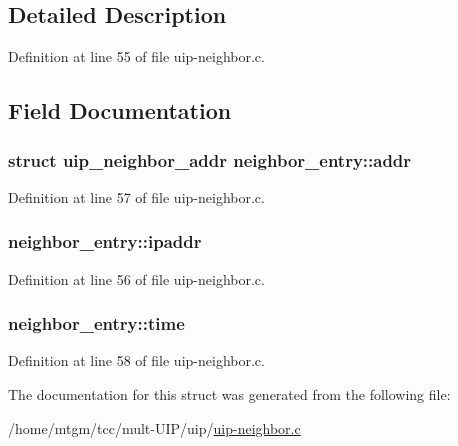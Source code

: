 \subsection{Detailed Description}


Definition at line 55 of file uip-\/neighbor.c.



\subsection{Field Documentation}
\hypertarget{structneighbor__entry_a52454396ea069977fa54372f9bbef992}{
\subsubsection[{addr}]{\setlength{\rightskip}{0pt plus 5cm}struct {\bf uip\_\-neighbor\_\-addr} {\bf neighbor\_\-entry::addr}}}
\label{structneighbor__entry_a52454396ea069977fa54372f9bbef992}


Definition at line 57 of file uip-\/neighbor.c.

\hypertarget{structneighbor__entry_afaed134859c9ee8763e6961c8ac55917}{
\subsubsection[{ipaddr}]{ {\bf neighbor\_\-entry::ipaddr}}}
\label{structneighbor__entry_afaed134859c9ee8763e6961c8ac55917}


Definition at line 56 of file uip-\/neighbor.c.

\hypertarget{structneighbor__entry_a0adf1b5aea439695cbd94b348eb4511b}{
\subsubsection[{time}]{ {\bf neighbor\_\-entry::time}}}
\label{structneighbor__entry_a0adf1b5aea439695cbd94b348eb4511b}


Definition at line 58 of file uip-\/neighbor.c.



The documentation for this struct was generated from the following file:\begin{DoxyCompactItemize}
\item 
/home/mtgm/tcc/mult-\/UIP/uip/\hyperlink{uip-neighbor_8c}{uip-\/neighbor.c}\end{DoxyCompactItemize}
